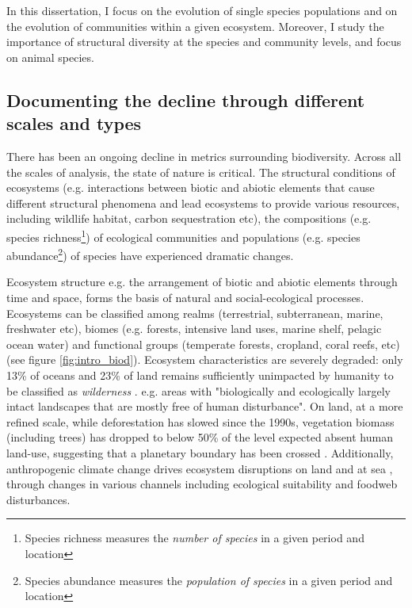 In this dissertation, I focus on the evolution of single species populations and on the evolution of communities  within a given ecosystem. Moreover, I study the importance of structural diversity at the species and community levels, and focus on animal species. 

\subsection*{Documenting the decline through different scales and types}

There has been an ongoing decline in metrics surrounding biodiversity. Across all the scales of analysis, the state of nature is critical. The structural conditions of ecosystems (e.g. interactions between biotic and abiotic elements that cause different structural phenomena and lead ecosystems to provide various resources, including wildlife habitat, carbon sequestration etc), the compositions (e.g. species richness\footnote{ Species richness measures the \textit{number of species} in a given period and location}) of ecological communities and populations (e.g. species abundance\footnote{ Species abundance measures the \textit{population of species} in a given period and location}) of species have experienced dramatic changes. 

Ecosystem structure e.g. the arrangement of biotic and abiotic elements through time and space, forms the basis of natural and social-ecological processes. Ecosystems can be classified among realms (terrestrial, subterranean, marine, freshwater etc), biomes (e.g. forests, intensive land uses, marine shelf, pelagic ocean water) and functional groups (temperate forests, cropland, coral reefs, etc) (see figure \ref{fig:intro_biod}). Ecosystem characteristics are severely degraded: only 13\% of oceans and 23\% of land remains sufficiently unimpacted by humanity to be classified as \textit{wilderness} \citep{watson_2016_catastrophic, jones_2018_location}. e.g. areas with "biologically and ecologically largely intact landscapes that are mostly free of human disturbance". On land, at a more refined scale, while deforestation has slowed since the 1990s, vegetation biomass (including trees) has dropped to below 50\% of the level expected absent human land-use, suggesting that a planetary boundary has been crossed \citep{steffen_2015_planetary}. Additionally, anthropogenic climate change drives ecosystem disruptions on land \citep{burrell_anthropogenic_2020, conradi_reassessment_2024} and at sea \citep{gomes_marine_2024}, through changes in various channels including ecological suitability and foodweb disturbances.

